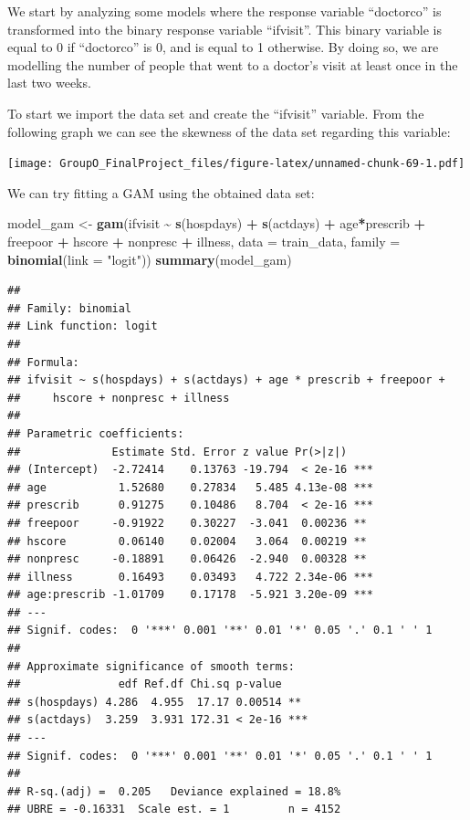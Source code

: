 \documentclass[
]{article}
\newenvironment{Shaded}{\begin{snugshade}}{\end{snugshade}}
\newcommand{\AttributeTok}[1]{\textcolor[rgb]{0.13,0.29,0.53}{#1}}
\newcommand{\FunctionTok}[1]{\textcolor[rgb]{0.13,0.29,0.53}{\textbf{#1}}}
\newcommand{\NormalTok}[1]{#1}
\newcommand{\OtherTok}[1]{\textcolor[rgb]{0.56,0.35,0.01}{#1}}
\newcommand{\SpecialCharTok}[1]{\textcolor[rgb]{0.81,0.36,0.00}{\textbf{#1}}}
\newcommand{\StringTok}[1]{\textcolor[rgb]{0.31,0.60,0.02}{#1}}
\begin{document}
We start by analyzing some models where the response variable
``doctorco'' is transformed into the binary response variable
``ifvisit''. This binary variable is equal to 0 if ``doctorco'' is 0,
and is equal to 1 otherwise. By doing so, we are modelling the number of
people that went to a doctor's visit at least once in the last two
weeks.

To start we import the data set and create the ``ifvisit'' variable.
From the following graph we can see the skewness of the data set
regarding this variable:

\texttt{[image: GroupO\_FinalProject\_files/figure-latex/unnamed-chunk-69-1.pdf]}

We can try fitting a GAM using the obtained data set:

\begin{Shaded}
\begin{Highlighting}[]
\NormalTok{model\_gam }\OtherTok{\textless{}{-}} \FunctionTok{gam}\NormalTok{(ifvisit }\SpecialCharTok{\textasciitilde{}} \FunctionTok{s}\NormalTok{(hospdays) }\SpecialCharTok{+} \FunctionTok{s}\NormalTok{(actdays) }\SpecialCharTok{+}\NormalTok{ age}\SpecialCharTok{*}\NormalTok{prescrib }\SpecialCharTok{+}\NormalTok{ freepoor }\SpecialCharTok{+}\NormalTok{ hscore }\SpecialCharTok{+}\NormalTok{ nonpresc }\SpecialCharTok{+}\NormalTok{ illness, }\AttributeTok{data =}\NormalTok{ train\_data, }\AttributeTok{family =} \FunctionTok{binomial}\NormalTok{(}\AttributeTok{link =} \StringTok{"logit"}\NormalTok{))}
\FunctionTok{summary}\NormalTok{(model\_gam)}
\end{Highlighting}
\end{Shaded}

\begin{verbatim}
## 
## Family: binomial 
## Link function: logit 
## 
## Formula:
## ifvisit ~ s(hospdays) + s(actdays) + age * prescrib + freepoor + 
##     hscore + nonpresc + illness
## 
## Parametric coefficients:
##              Estimate Std. Error z value Pr(>|z|)    
## (Intercept)  -2.72414    0.13763 -19.794  < 2e-16 ***
## age           1.52680    0.27834   5.485 4.13e-08 ***
## prescrib      0.91275    0.10486   8.704  < 2e-16 ***
## freepoor     -0.91922    0.30227  -3.041  0.00236 ** 
## hscore        0.06140    0.02004   3.064  0.00219 ** 
## nonpresc     -0.18891    0.06426  -2.940  0.00328 ** 
## illness       0.16493    0.03493   4.722 2.34e-06 ***
## age:prescrib -1.01709    0.17178  -5.921 3.20e-09 ***
## ---
## Signif. codes:  0 '***' 0.001 '**' 0.01 '*' 0.05 '.' 0.1 ' ' 1
## 
## Approximate significance of smooth terms:
##               edf Ref.df Chi.sq p-value    
## s(hospdays) 4.286  4.955  17.17 0.00514 ** 
## s(actdays)  3.259  3.931 172.31 < 2e-16 ***
## ---
## Signif. codes:  0 '***' 0.001 '**' 0.01 '*' 0.05 '.' 0.1 ' ' 1
## 
## R-sq.(adj) =  0.205   Deviance explained = 18.8%
## UBRE = -0.16331  Scale est. = 1         n = 4152
\end{verbatim}
\end{document}
